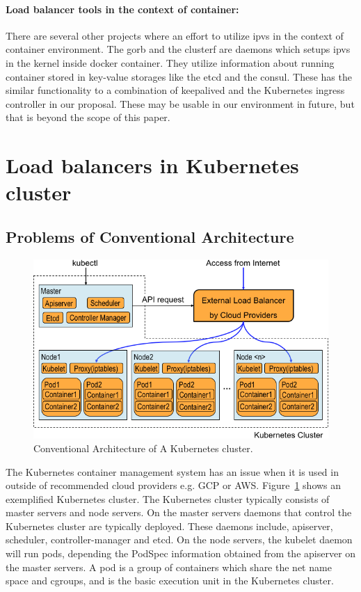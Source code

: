\paragraph{\bf Load balancer tools in the context of container:}
There are several other projects where an effort to utilize ipvs in the context of container environment.
The gorb\cite{Sibiryov2015} and the clusterf\cite{Aaltodoc:http://urn.fi/URN:NBN:fi:aalto-201611025433} are daemons 
which setups ipvs in the kernel inside docker container. They utilize information about running container stored in key-value storages
like the etcd\cite{CoreOSEtcd} and the consul\cite{HashiCorpConsul}. 
These has the similar functionality to a combination of keepalived and the Kubernetes ingress controller in our proposal.
These may be usable in our environment in future, but that is beyond the scope of this paper.

\section{Load balancers in Kubernetes cluster}\label{Load balancers in Kubernetes cluster}

\subsection{Problems of Conventional Architecture}

\begin{figure}
\includegraphics[width=\columnwidth]{Figs/K8sConventional}
\caption{Conventional Architecture of A Kubernetes cluster.}
\label{fig:K8sConventional}
\end{figure}

The Kubernetes container management system has an issue when it is used in outside of recommended cloud providers e.g. GCP or AWS.
Figure~\ref{fig:K8sConventional} shows an exemplified Kubernetes cluster.
The Kubernetes cluster typically consists of master servers and node servers.
On the master servers daemons that control the Kubernetes cluster are typically deployed. 
These daemons include, apiserver, scheduler, controller-manager and etcd. 
On the node servers, the kubelet daemon will run pods, depending the PodSpec information obtained from the apiserver on the master servers.
A pod is a group of containers which share the net name space and cgroups, 
and is the basic execution unit in the Kubernetes cluster.

